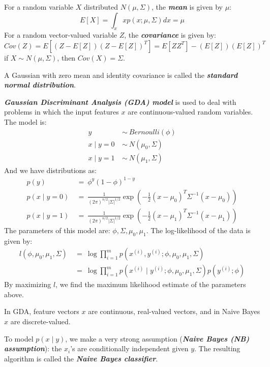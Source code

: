 \documentclass{article}
\begin{document}
For a random variable $X$ distributed $N(\mu, \Sigma)$, the \emph{\textbf{mean}} is given by $\mu$:
\begin{equation*}
E[X]=\int_x xp(x;\mu,\Sigma)dx=\mu
\end{equation*}
For a random vector-valued variable $Z$, the \emph{\textbf{covariance}} is given by:
\begin{equation*}
Cov(Z)=E[(Z-E[Z])(Z-E[Z])^T]=E[ZZ^T]-(E[Z])(E[Z])^T
\end{equation*}
if $X\sim N(\mu,\Sigma)$, then $Cov(X)=\Sigma$.

A Gaussian with zero mean and identity covariance is called the \emph{\textbf{standard normal distribution}}.

\emph{\textbf{Gaussian Discriminant Analysis (GDA) model}} is used to deal with problems in which the input features $x$ are continuous-valued random variables.
The model is:
\begin{align*}
y\ &\sim\ Bernoulli(\phi) \\
x\mid y=0\ &\sim\ N(\mu_0,\Sigma) \\
x\mid y=1\ &\sim\ N(\mu_1,\Sigma) 
\end{align*}
And we have distributions as:
\begin{align*}
p(y)\ &=\ \phi^y(1-\phi)^{1-y} \\
p(x\mid y=0)\ &=\ \frac{1}{(2\pi)^{n/2}\lvert\Sigma\rvert^{1/2}}\exp\left(-\frac{1}{2}(x-\mu_0)^T\Sigma^{-1}(x-\mu_0)\right) \\
p(x\mid y=1)\ &=\ \frac{1}{(2\pi)^{n/2}\lvert\Sigma\rvert^{1/2}}\exp\left(-\frac{1}{2}(x-\mu_1)^T\Sigma^{-1}(x-\mu_1)\right)
\end{align*}
The parameters of this model are: $\phi, \Sigma, \mu_0, \mu_1$.
The log-likelihood of the data is given by:
\begin{align*}
l(\phi, \mu_0, \mu_1, \Sigma)\ &=\ \log\prod_{i=1}^mp(x^{(i)},y^{(i)};\phi,\mu_0,\mu_1,\Sigma) \\
                               &=\ \log\prod_{i=1}^mp(x^{(i)}\mid y^{(i)};\phi,\mu_0,\mu_1,\Sigma)p(y^{(i)};\phi)
\end{align*}
By maximizing $l$, we find the maximum likelihood estimate of the parameters above.

In GDA, feature vectors $x$ are continuous, real-valued vectors, and in Naive Bayes $x$ are discrete-valued.

To model $p(x\mid y)$, we make a very strong assumption (\emph{\textbf{Naive Bayes (NB) assumption}}): the $x_i$'s are conditionally independent given $y$. The resulting algorithm is called the \emph{\textbf{Naive Bayes classifier}}.
\end{document}

